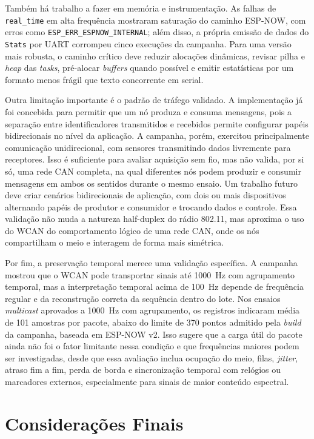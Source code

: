Também há trabalho a fazer em memória e instrumentação. As falhas de
\texttt{real\_time} em alta frequência mostraram saturação do caminho ESP-NOW,
com erros como \texttt{ESP\_ERR\_ESPNOW\_INTERNAL}; além disso, a própria emissão de dados do \texttt{Stats}
por UART corrompeu cinco execuções da campanha. Para uma versão
mais robusta, o caminho crítico deve reduzir alocações dinâmicas, revisar pilha e
\emph{heap} das \emph{tasks}, pré-alocar \emph{buffers} quando possível e emitir estatísticas por um
formato menos frágil que texto concorrente em serial.

Outra limitação importante é o padrão de tráfego validado. A implementação já foi
concebida para permitir que um nó produza e consuma mensagens, pois a separação
entre identificadores transmitidos e recebidos permite configurar papéis
bidirecionais no nível da aplicação. A campanha, porém, exercitou principalmente
comunicação unidirecional, com sensores transmitindo dados livremente para
receptores. Isso é suficiente para avaliar aquisição sem fio, mas não valida, por
si só, uma rede CAN completa, na qual diferentes nós podem produzir e consumir
mensagens em ambos os sentidos durante o mesmo ensaio. Um trabalho futuro deve
criar cenários bidirecionais de aplicação, com dois ou mais dispositivos
alternando papéis de produtor e consumidor e trocando dados e controle. Essa
validação não muda a natureza half-duplex do rádio 802.11, mas aproxima o uso do
WCAN do comportamento lógico de uma rede CAN, onde os nós compartilham o meio e
interagem de forma mais simétrica.

Por fim, a preservação temporal merece uma validação específica. A campanha
mostrou que o WCAN pode transportar sinais até 1000~Hz com agrupamento temporal, mas
a interpretação temporal acima de 100~Hz depende de frequência regular e da
reconstrução correta da sequência dentro do lote. Nos ensaios \emph{multicast}
aprovados a 1000~Hz com agrupamento, os registros indicaram média de 101 amostras
por pacote, abaixo do limite de 370 pontos admitido pela \emph{build} da campanha,
baseada em ESP-NOW v2. Isso sugere que a carga útil do pacote ainda não foi o fator limitante
nessa condição e que frequências maiores podem ser investigadas, desde que essa
avaliação inclua ocupação do meio, filas, \emph{jitter}, atraso fim a fim, perda
de borda e sincronização temporal com relógios ou marcadores externos,
especialmente para sinais de maior conteúdo espectral.

\section{Considerações Finais}

